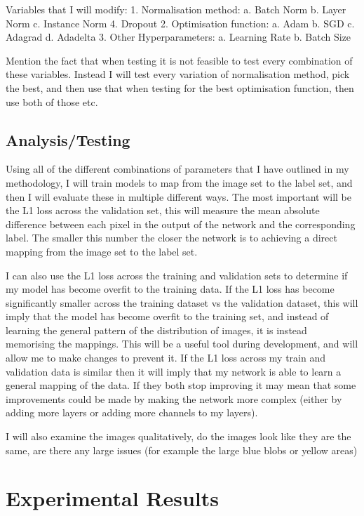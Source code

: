 \documentclass[11pt]{article}
\begin{document}
Variables that I will modify:
1. Normalisation method:
a. Batch Norm
b. Layer Norm
c. Instance Norm
4. Dropout
2. Optimisation function:
a. Adam
b. SGD
c. Adagrad
d. Adadelta
3. Other Hyperparameters:
a. Learning Rate
b. Batch Size

Mention the fact that when testing it is not feasible to test every combination of these variables. Instead I will test every variation of normalisation method, pick the best, and then use that when testing for the best optimisation function, then use both of those etc. 

\subsection{Analysis/Testing}

Using all of the different combinations of parameters that I have outlined in my methodology, I will train models to map from the image set to the label set, and then I will evaluate these in multiple different ways. The most important will be the L1 loss across the validation set, this will measure the mean absolute difference between each pixel in the output of the network and the corresponding label. The smaller this number the closer the network is to achieving a direct mapping from the image set to the label set. 

I can also use the L1 loss across the training and validation sets to determine if my model has become overfit to the training data. If the L1 loss has become significantly smaller across the training dataset vs the validation dataset, this will imply that the model has become overfit to the training set, and instead of learning the general pattern of the distribution of images, it is instead memorising the mappings. This will be a useful tool during development, and will allow me to make changes to prevent it. If the L1 loss across my train and validation data is similar then it will imply that my network is able to learn a general mapping of the data. If they both stop improving it may mean that some improvements could be made by making the network more complex (either by adding more layers or adding more channels to my layers). 

I will also examine the images qualitatively, do the images look like they are the same, are there any large issues (for example the large blue blobs or yellow areas)

\newpage{}

\section{Experimental Results}
\end{document}
